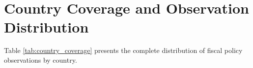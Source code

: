 \documentclass[12pt]{article}
\begin{document}
\newpage
\FloatBarrier



\vspace{0.3cm}


\newpage
\appendix

\section{Country Coverage and Observation Distribution}
\label{app:country_coverage}

Table \ref{tab:country_coverage} presents the complete distribution of fiscal policy observations by country.
\end{document}
